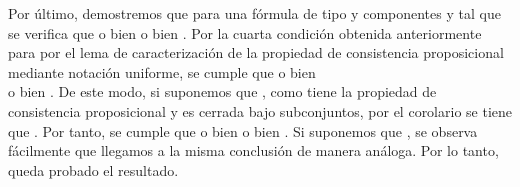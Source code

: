\begin{isabellebody}
\begin{isamarkuptext}
\begin{demostracion}
    Por último, demostremos que para una fórmula  de tipo \isa{{\isasymbeta}} y componentes  y  tal que
     se verifica que o bien  o bien . Por la cuarta condición obtenida 
    anteriormente para  por el lema de caracterización de la propiedad de consistencia 
    proposicional mediante notación uniforme, se cumple que o bien\\  o bien 
    . De este modo, si suponemos que , como  tiene la propiedad de 
    consistencia proposicional y es cerrada bajo subconjuntos, por el corolario  se tiene 
    que . Por tanto, se cumple que o bien  o bien . Si suponemos que 
    , se observa fácilmente que llegamos a la misma conclusión de manera análoga. 
    Por lo tanto, queda probado el resultado.
  \end{demostracion}


\end{isamarkuptext}
\end{isabellebody}
